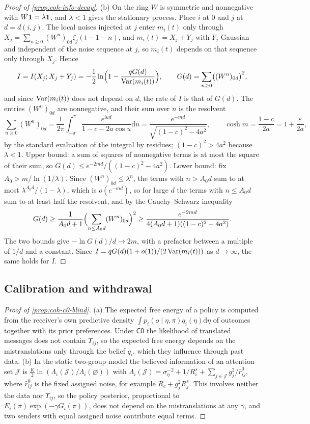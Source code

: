 \begin{proof}[Proof of \cref{prop:coh-info-decay}]
(b) On the ring $W$ is symmetric and nonnegative with $W\mathbf{1}=\lambda\mathbf{1}$, and $\lambda<1$ gives the stationary process. Place $i$ at $0$ and $j$ at $d=d(i,j)$. The local noises injected at $j$ enter $m_i(t)$ only through $X_j=\sum_{n\ge0}(W^n)_{0d}\zeta_j(t-1-n)$, and $m_i(t)=X_j+Y_j$ with $Y_j$ Gaussian and independent of the noise sequence at $j$, so $m_i(t)$ depends on that sequence only through $X_j$. Hence
\[ I=I(X_j;X_j+Y_j)=-\frac12\ln\Bigl(1-\frac{qG(d)}{\operatorname{Var}(m_i(t))}\Bigr),\qquad G(d)=\sum_{n\ge0}\bigl((W^n)_{0d}\bigr)^2, \]
and since $\operatorname{Var}(m_i(t))$ does not depend on $d$, the rate of $I$ is that of $G(d)$. The entries $(W^n)_{0d}$ are nonnegative, and their sum over $n$ is the resolvent
\[ \sum_{n\ge0}(W^n)_{0d}=\frac1{2\pi}\int_{-\pi}^{\pi}\frac{e^{\mathrm iud}}{1-c-2a\cos u}\mathrm{d}u=\frac{e^{-md}}{\sqrt{(1-c)^2-4a^2}},\qquad\cosh m=\frac{1-c}{2a}=1+\frac{\varepsilon}{2a}, \]
by the standard evaluation of the integral by residues; $(1-c)^2>4a^2$ because $\lambda<1$. Upper bound: a sum of squares of nonnegative terms is at most the square of their sum, so $G(d)\le e^{-2md}/((1-c)^2-4a^2)$. Lower bound: fix $A_0>m/\ln(1/\lambda)$. Since $(W^n)_{0d}\le\lambda^n$, the terms with $n>A_0d$ sum to at most $\lambda^{A_0d}/(1-\lambda)$, which is $o(e^{-md})$, so for large $d$ the terms with $n\le A_0d$ sum to at least half the resolvent, and by the Cauchy--Schwarz inequality
\[ G(d)\ge\frac{1}{A_0d+1}\Bigl(\sum_{n\le A_0d}(W^n)_{0d}\Bigr)^2\ge\frac{e^{-2md}}{4(A_0d+1)((1-c)^2-4a^2)}. \]
The two bounds give $-\ln G(d)/d\to2m$, with a prefactor between a multiple of $1/d$ and a constant. Since $I=qG(d)(1+o(1))/(2\operatorname{Var}(m_i(t)))$ as $d\to\infty$, the same holds for $I$.
\end{proof}

\subsection{Calibration and withdrawal}\label{app:coh-calibration}

\begin{proof}[Proof of \cref{prop:coh-c0-blind}]
(a) The expected free energy of a policy is computed from the receiver's own predictive density $\int p_i(o\mid\eta,\pi)q_i(\eta)\mathrm{d}\eta$ of outcomes together with its prior preferences. Under $\mathsf{C0}$ the likelihood of translated messages does not contain $\Upsilon_{ij}$, so the expected free energy depends on the mistranslations only through the belief $q_i$, which they influence through past data. (b) In the static two-group model the believed information of an attention set $\mathcal J$ is $\frac K2\ln(\Lambda_i(\mathcal J)/\Lambda_i(\varnothing))$ with $\Lambda_i(\mathcal J)=\sigma_\eta^{-2}+1/R^s_i+\sum_{j\in\mathcal J}g_j^2/\hat r^0_{ij}$, where $\hat r^0_{ij}$ is the fixed assigned noise, for example $R_c+g_j^2R^s_j$. This involves neither the data nor $\Upsilon_{ij}$, so the policy posterior, proportional to $E_i(\pi)\exp(-\gamma G_i(\pi))$, does not depend on the mistranslations at any $\gamma$, and two senders with equal assigned noise contribute equal terms.
\end{proof}

